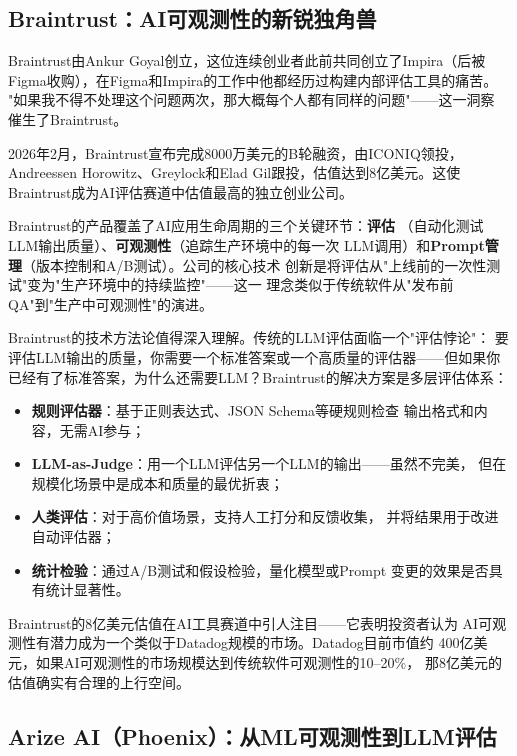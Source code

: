 \subsection{Braintrust：AI可观测性的新锐独角兽}
\label{subsec:braintrust}

Braintrust由Ankur Goyal创立，这位连续创业者此前共同创立了Impira（后被
Figma收购），在Figma和Impira的工作中他都经历过构建内部评估工具的痛苦。
"如果我不得不处理这个问题两次，那大概每个人都有同样的问题"——这一洞察
催生了Braintrust。

2026年2月，Braintrust宣布完成8000万美元的B轮融资，由ICONIQ领投，
Andreessen Horowitz、Greylock和Elad Gil跟投，估值达到8亿美元。这使
Braintrust成为AI评估赛道中估值最高的独立创业公司。

Braintrust的产品覆盖了AI应用生命周期的三个关键环节：\textbf{评估}
（自动化测试LLM输出质量）、\textbf{可观测性}（追踪生产环境中的每一次
LLM调用）和\textbf{Prompt管理}（版本控制和A/B测试）。公司的核心技术
创新是将评估从"上线前的一次性测试"变为"生产环境中的持续监控"——这一
理念类似于传统软件从"发布前QA"到"生产中可观测性"的演进。

Braintrust的技术方法论值得深入理解。传统的LLM评估面临一个"评估悖论"：
要评估LLM输出的质量，你需要一个标准答案或一个高质量的评估器——但如果你
已经有了标准答案，为什么还需要LLM？Braintrust的解决方案是多层评估体系：
\begin{itemize}
  \item \textbf{规则评估器}：基于正则表达式、JSON Schema等硬规则检查
    输出格式和内容，无需AI参与；
  \item \textbf{LLM-as-Judge}：用一个LLM评估另一个LLM的输出——虽然不完美，
    但在规模化场景中是成本和质量的最优折衷；
  \item \textbf{人类评估}：对于高价值场景，支持人工打分和反馈收集，
    并将结果用于改进自动评估器；
  \item \textbf{统计检验}：通过A/B测试和假设检验，量化模型或Prompt
    变更的效果是否具有统计显著性。
\end{itemize}

Braintrust的8亿美元估值在AI工具赛道中引人注目——它表明投资者认为
AI可观测性有潜力成为一个类似于Datadog规模的市场。Datadog目前市值约
400亿美元，如果AI可观测性的市场规模达到传统软件可观测性的10--20\%，
那8亿美元的估值确实有合理的上行空间。

\subsection{Arize AI（Phoenix）：从ML可观测性到LLM评估}
\label{subsec:arize}

